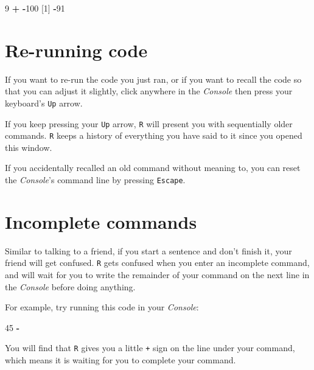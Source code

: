 \documentclass[
]{book}
\newenvironment{Shaded}{\begin{snugshade}}{\end{snugshade}}
\newcommand{\DecValTok}[1]{\textcolor[rgb]{0.00,0.00,0.81}{#1}}
\newcommand{\NormalTok}[1]{#1}
\newcommand{\SpecialCharTok}[1]{\textcolor[rgb]{0.81,0.36,0.00}{\textbf{#1}}}
\begin{document}
\begin{Shaded}
\begin{Highlighting}[]
\DecValTok{9} \SpecialCharTok{+} \SpecialCharTok{{-}}\DecValTok{100}
\NormalTok{[}\DecValTok{1}\NormalTok{] }\SpecialCharTok{{-}}\DecValTok{91}
\end{Highlighting}
\end{Shaded}

\section*{Re-running code}\label{re-running-code}

If you want to re-run the code you just ran, or if you want to recall the code so that you can adjust it slightly, click anywhere in the \emph{Console} then press your keyboard's \texttt{Up} arrow.

If you keep pressing your \texttt{Up} arrow, \texttt{R} will present you with sequentially older commands. \texttt{R} keeps a history of everything you have said to it since you opened this window.

If you accidentally recalled an old command without meaning to, you can reset the \emph{Console}'s command line by pressing \texttt{Escape}.

\section*{Incomplete commands}\label{incomplete-commands}

Similar to talking to a friend, if you start a sentence and don't finish it, your friend will get confused. \texttt{R} gets confused when you enter an incomplete command, and will wait for you to write the remainder of your command on the next line in the \emph{Console} before doing anything.

For example, try running this code in your \emph{Console}:

\begin{Shaded}
\begin{Highlighting}[]
\DecValTok{45} \SpecialCharTok{{-}}
\end{Highlighting}
\end{Shaded}

You will find that \texttt{R} gives you a little \texttt{+} sign on the line under your command, which means it is waiting for you to complete your command.
\end{document}
